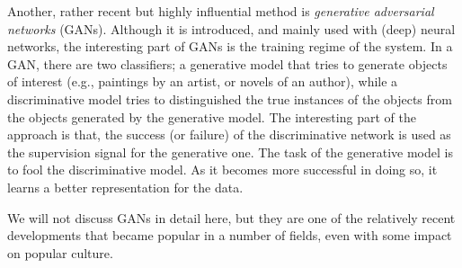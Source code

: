 Another, rather recent but highly influential method is
\emph{generative adversarial networks} (GANs).
Although it is introduced, and mainly used with (deep) neural networks,
the interesting part of GANs is the training regime of the system.
In a GAN, there are two classifiers;
a generative model that tries to generate objects of interest
(e.g., paintings by an artist, or novels of an author),
while a discriminative model tries to distinguished
the true instances of the objects from the objects generated
by the generative model.
The interesting part of the approach is that,
the success (or failure) of the discriminative network is used
as the supervision signal for the generative one.
The task of the generative model is to fool the discriminative model.
As it becomes more successful in doing so,
it learns a better representation for the data.

We will not discuss GANs in detail here,
but they are one of the relatively recent developments that
became popular in a number of fields,
even with some impact on popular culture.%

% 
% 
% 
% 
